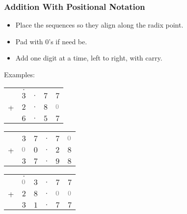 \begin{frame}

\frametitle{Addition With Positional Notation}

\begin{itemize}

\item Place the sequences so they align along the radix point.

\item Pad with 0's if need be.

\item Add one digit at a time, left to right, with carry.

\end{itemize}

\vspace{\fill}

Examples:

\begin{minipage}{0.3\textwidth}
\begin{center}
{\setlength{\tabcolsep}{1pt}
\begin{tabular}{ccccc}
  & $.$ \\
  & $3$ & $.$ & $7$ & $7$  \\
+ & $2$ & $.$ & $8$ & ${\color{gray}0}$   \\ \hline
  & $6$ & $.$ & $5$ & $7$
\end{tabular}
}
\end{center}
\end{minipage}%
\begin{minipage}{0.3\textwidth}
\begin{center}
{\setlength{\tabcolsep}{1pt}
\begin{tabular}{cccccc}
  & \\
  & $3$ & $7$ & $.$ & $7$ & ${\color{gray}0}$  \\
+ & ${\color{gray}0}$ & $0$ & $.$ & $2$ & $8$   \\ \hline
  & $3$ & $7$ & $.$ & $9$ & $8$
\end{tabular}
}
\end{center}
\end{minipage}%
\begin{minipage}{0.3\textwidth}
\begin{center}
{\setlength{\tabcolsep}{1pt}
\begin{tabular}{cccccc}
  & $.$ \\
  & ${\color{gray}0}$ & $3$ & $.$ & $7$ & $7$  \\
+ & $2$ & $8$ & $.$ & ${\color{gray}0}$ & ${\color{gray}0}$ \\ \hline
  & $3$ & $1$ & $.$ & $7$ & $7$
\end{tabular}
}
\end{center}
\end{minipage}

\end{frame}

